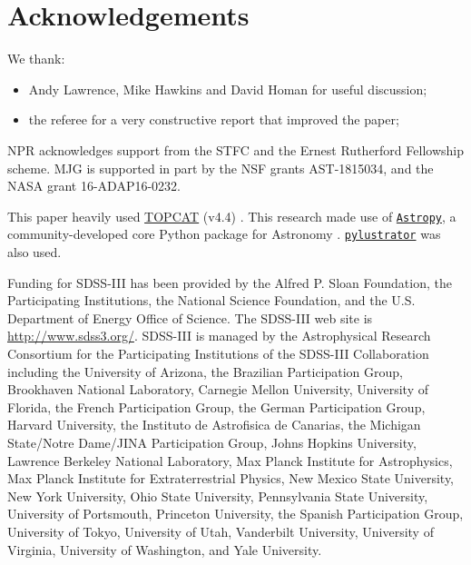 \documentclass[fleqn,usenatbib]{mnras}
\begin{document}
\section*{Acknowledgements}
We thank: \\
\begin{itemize}
\item Andy Lawrence, Mike Hawkins and David Homan for useful discussion;
\item the referee for a very constructive report that improved the paper;
\end{itemize}
NPR acknowledges support from the STFC and the Ernest Rutherford Fellowship scheme.
MJG is supported in part by the NSF grants AST-1815034, and the NASA grant 16-ADAP16-0232.

This paper heavily used \href{http://www.star.bris.ac.uk/~mbt/topcat/}{TOPCAT} (v4.4)
\citep[][]{Taylor2005, Taylor2011}.
This research made use of \href{http://www.astropy.org}{\tt Astropy}, 
a community-developed core Python package for Astronomy 
\citep{AstropyCollaboration2013, AstropyCollaboration2018}.
\href{https://pylustrator.readthedocs.io/en/latest/}{\tt pylustrator} \citep{Gerum2019} was also used. 

Funding for SDSS-III has been provided by the Alfred P. Sloan
Foundation, the Participating Institutions, the National Science
Foundation, and the U.S. Department of Energy Office of Science. The
SDSS-III web site is
\href{http://www.sdss3.org/}{http://www.sdss3.org/}.
SDSS-III is managed by the Astrophysical Research Consortium for the
Participating Institutions of the SDSS-III Collaboration including the
University of Arizona, the Brazilian Participation Group, Brookhaven
National Laboratory, Carnegie Mellon University, University of
Florida, the French Participation Group, the German Participation
Group, Harvard University, the Instituto de Astrofisica de Canarias,
the Michigan State/Notre Dame/JINA Participation Group, Johns Hopkins
University, Lawrence Berkeley National Laboratory, Max Planck
Institute for Astrophysics, Max Planck Institute for Extraterrestrial
Physics, New Mexico State University, New York University, Ohio State
University, Pennsylvania State University, University of Portsmouth,
Princeton University, the Spanish Participation Group, University of
Tokyo, University of Utah, Vanderbilt University, University of
Virginia, University of Washington, and Yale University.
\end{document}
